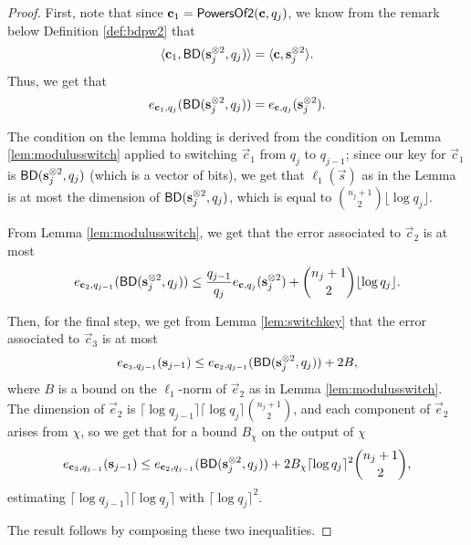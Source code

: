     \begin{proof}

        First, note that since $\vec{c}_1 = {\sf PowersOf2}(\vec{c}, q_j)$, we know from the remark below Definition \ref{def:bdpw2} that
        \[\langle \vec{c}_1, {\sf BD}(\vec{s}_j^{\otimes 2}, q_j) \rangle = \langle \vec{c}, \vec{s}_j^{\otimes 2} \rangle.\] Thus, we get that
        \[e_{\vec{c}_1, q_j}({\sf BD}(\vec{s}_j^{\otimes 2}, q_j)) = e_{\vec{c}, q_j}(\vec{s}_j^{\otimes 2}).\]

        The condition on the lemma holding is derived from the condition on Lemma \ref{lem:modulusswitch} applied to switching $\vec{c}_1$ from $q_j$ to $q_{j-1}$; since our key for $\vec{c}_1$ is ${\sf BD}(\vec{s}_j^{\otimes 2}, q_j)$ (which is a vector of bits), we get that $\ell_1(\vec{s})$ as in the Lemma is at most the dimension of ${\sf BD}(\vec{s}_j^{\otimes 2}, q_j)$,
        which is equal to ${{n_j + 1}\choose{2}} \lfloor \log q_j \rfloor$.

        From Lemma \ref{lem:modulusswitch}, we get that the error associated to $\vec{c}_2$ is at most
        \[e_{\vec{c}_2, q_{j-1}}({\sf BD}(\vec{s}_j^{\otimes 2}, q_j)) \leq \frac{q_{j-1}}{q_j} e_{\vec{c}, q_j}(\vec{s}_j^{\otimes 2}) + {{n_j+1} \choose{2}}\lfloor \log q_j \rfloor.\]

        Then, for the final step, we get from Lemma \ref{lem:switchkey} that the error associated to $\vec{c}_3$ is at most
        \[e_{\vec{c}_3, q_{j-1}}(\vec{s}_{j-1}) \leq e_{\vec{c}_2, q_{j-1}}({\sf BD}(\vec{s}_j^{\otimes 2}, q_j)) + 2B,\]
        where $B$ is a bound on the $\ell_1$-norm of $\vec{e}_2$ as in Lemma \ref{lem:modulusswitch}. The dimension of $\vec{e}_2$ is $\lceil \log q_{j-1} \rceil \lceil \log q_j \rceil {{n_j+1}\choose{2}}$, and each component of $\vec{e}_2$ arises from $\chi$, so we get that for a bound $B_\chi$ on the output of $\chi$
        \[e_{\vec{c}_3, q_{j-1}}(\vec{s}_{j-1}) \leq e_{\vec{c}_2, q_{j-1}}({\sf BD}(\vec{s}_j^{\otimes 2}, q_j)) + 2 B_\chi \lceil \log q_j \rceil^2 {{n_j+1}\choose{2}},\]
        estimating  $\lceil \log q_{j-1} \rceil \lceil \log q_j \rceil$ with $\lceil \log q_j \rceil^2$.

        The result follows by composing these two inequalities.

    \end{proof}



